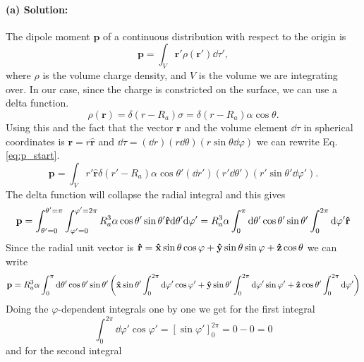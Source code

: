 \paragraph{(a) Solution:} The dipole moment $\mathbf{p}$ of a continuous distribution with respect to the origin is 
\begin{equation}
    \mathbf{p} = \int_V \mathbf{r}' \rho(\mathbf{r}')\dd \tau',\label{eq:p_start}
\end{equation}
where $\rho$ is the volume charge density, and $V$ is the volume we are integrating over. In our case, since the charge is constricted on the surface, we can use a delta function.
\begin{equation}
    \rho(\mathbf{r}) = \delta(r-R_a)\sigma = \delta(r-R_a)\alpha\cos\theta.
\end{equation}
Using this and the fact that the vector $\mathbf{r}$ and the volume element $\dd \tau$ in spherical coordinates is $\mathbf{r} = r\mathbf{\hat{r}}$ and $\dd \tau = (\dd r)(r \dd \theta)(r \sin\theta \dd\varphi)$ we can rewrite Eq. \eqref{eq:p_start}.
\begin{equation}
    \mathbf{p} = \int_V r' \mathbf{\hat{r}}\delta(r'-R_a)\alpha\cos\theta'(\dd r')(r' \dd \theta')(r' \sin\theta' \dd\varphi').
\end{equation}
The delta function will collapse the radial integral and this gives
\begin{equation}
    \mathbf{p} =\int_{\theta'=0}^{\theta'=\pi} \int_{\varphi'=0}^{\varphi'=2\pi} R_a^3\alpha \cos\theta' \sin\theta' \mathbf{\hat{r}}\dd\theta' \dd\varphi' = R_a^3 \alpha \int_{0}^{\pi}\dd\theta' \cos\theta' \sin\theta' \int_{0}^{2\pi} \dd\varphi' \mathbf{\hat{r}}
\end{equation}
Since the radial unit vector is $\mathbf{\hat{r}} = \mathbf{\hat{x}} \sin\theta \cos\varphi + \mathbf{\hat{y}} \sin\theta \sin\varphi + \mathbf{\hat{z}} \cos\theta$ we can write
\begin{equation}
    \mathbf{p} = R_a^3 \alpha \int_{0}^{\pi}\dd\theta' \cos\theta' \sin\theta' \left( \mathbf{\hat{x}}\sin\theta' \int_{0}^{2\pi}\dd\varphi' \cos\varphi' + \mathbf{\hat{y}}\sin\theta' \int_{0}^{2\pi}\dd\varphi' \sin\varphi' + \mathbf{\hat{z}}\cos\theta' \int_{0}^{2\pi} \dd\varphi'\right)\label{eq:p_new}
\end{equation}
Doing the $\varphi$-dependent integrals one by one we get for the first integral
\begin{equation}
    \int_{0}^{2\pi}\dd\varphi' \cos\varphi' = [\sin\varphi']_0^{2\pi} = 0 - 0 = 0
\end{equation}
and for the second integral
